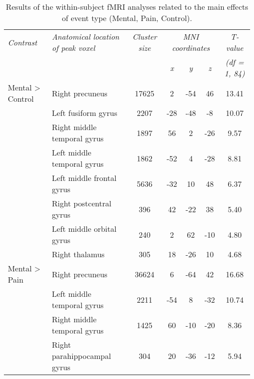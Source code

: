 \begin{table}[ht]
    \centering
    \captionsetup{justification=raggedright, singlelinecheck=false, font = normal} %
    \setlength{\tabcolsep}{6pt} %
    \renewcommand{\arraystretch}{1.5} %
    \caption{Results of the within-subject fMRI analyses related to the main effects of event type (Mental, Pain, Control).}
    \label{tab:fmri_analyses}
    \small
    \begin{tabular}{llccccc}
    \hline
    \textit{Contrast} & \textit{Anatomical location of peak voxel} & \textit{Cluster size} & \multicolumn{3}{c}{\textit{MNI coordinates}} & \textit{T-value} \\
     &  &  & \textit{x} & \textit{y} & \textit{z} & \textit{(df = 1, 84)} \\
    \hline
    Mental > Control & Right precuneus & 17625 & 2 & -54 & 46 & 13.41 \\
     & Left fusiform gyrus & 2207 & -28 & -48 & -8 & 10.07 \\
     & Right middle temporal gyrus & 1897 & 56 & 2 & -26 & 9.57 \\
     & Left middle temporal gyrus & 1862 & -52 & 4 & -28 & 8.81 \\
     & Left middle frontal gyrus & 5636 & -32 & 10 & 48 & 6.37 \\
     & Right postcentral gyrus & 396 & 42 & -22 & 38 & 5.40 \\
     & Left middle orbital gyrus & 240 & 2 & 62 & -10 & 4.80 \\
     & Right thalamus & 305 & 18 & -26 & 10 & 4.68 \\
    Mental > Pain & Right precuneus & 36624 & 6 & -64 & 42 & 16.68 \\
     & Left middle temporal gyrus & 2211 & -54 & 8 & -32 & 10.74 \\
     & Right middle temporal gyrus & 1425 & 60 & -10 & -20 & 8.36 \\
     & Right parahippocampal gyrus & 304 & 20 & -36 & -12 & 5.94 \\
    \hline
    \end{tabular}
    \normalsize
\end{table}

\newpage



\vspace{10pt}


